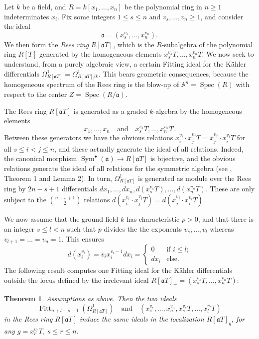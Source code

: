 \documentclass[oneside, 12pt]{amsart}
\newtheorem{theorem}{Theorem}[section]
\theoremstyle{definition}
\theoremstyle{remark}
\renewcommand{\AA}{\mathbb{A}}
\newcommand{\ideala}{\mathfrak{a}}
\newcommand{\Fitt}{\operatorname{Fitt}}
\newcommand{\quadand}{\quad\text{and}\quad}
\newcommand{\ra}{\rightarrow}
\newcommand{\Spec}{\operatorname{Spec}}
\newcommand{\Sym}{\operatorname{Sym}}
\begin{document}
Let $k$ be a field, and $R=k[x_1,\ldots,x_n]$ be the polynomial
ring in $n\geq 1$ indeterminates $x_i$. 
Fix some integers $1\leq s\leq n$ and  $v_s,\ldots,v_n \geq 1$,
and consider the ideal
$$
\ideala=(x_s^{v_s},\ldots,x_n^{v_n}).
$$
We then form the \emph{Rees ring} $R[\ideala T]$, 
which is the $R$-subalgebra of the polynomial ring $R[T]$
generated by the homogeneous elements $x_s^{v_s}T,\ldots,x_n^{v_n}T$.
We now seek to understand, from a purely algebraic view,   a certain Fitting ideal  
for the K\"ahler differentials 
$\Omega^1_{R[\ideala T]} = \Omega^1_{R[\ideala T]/k}$.  
This bears geometric consequences,
because the homogeneous spectrum of the Rees ring is the blow-up of $\AA^n=\Spec(R)$
with respect to the center $Z=\Spec(R/\ideala)$.

The Rees ring $R[\ideala T]$ is generated as a graded $k$-algebra 
by the homogeneous elements
$$
x_1 ,\ldots,x_n \quadand x_s^{v_s}T,\ldots,x_n^{v_n}T.
$$
Between these generators we  have the obvious relations
$x_i^{v_i}\cdot x_j^{v_j}T = x_j^{v_j}\cdot x_i^{v_i}T$ 
for all $s\leq i< j\leq n$, and these actually generate the ideal of all relations.
Indeed, the canonical morphism $\Sym^\bullet(\ideala)\ra R[\ideala T]$ is bijective,
and the obvious relations generate the ideal of all relations for the symmetric algebra
(see \cite{Micali 1964}, Theorem 1 and Lemma 2).
In turn,    $\Omega^1_{R[\ideala T]}$ is generated as module over the Rees ring by   $2n-s+1$ differentials 
$dx_1, \ldots, dx_n, d(x_s^{v_s}T),\ldots,d(x_n^{v_n}T)$.
These are only subject  to the $\binom{n-s+1}{2}$ relations $d(x_i^{v_i}\cdot x_j^{v_j}T) = d(x_j^{v_j}\cdot x_i^{v_i}T)$.

We now assume that the ground field $k$ has characteristic $p>0$, and  that there is an integer $s \leq l<n$
such that   $p$ divides the the  exponents $v_s,\ldots,v_l$
whereas  $v_{l+1}=\ldots=v_n=1$. This ensures
$$
d(x_i^{v_i})= v_ix_i^{v_i-1}dx_i= \begin{cases}
0 & \text{if $i\leq l$;}\\
dx_i	& \text{else.}
\end{cases}
$$
The  following result computes one Fitting ideal for the K\"ahler differentials outside the locus
defined by the irrelevant ideal $R[\ideala T]_+=(x_s^{v_s}T,\ldots,x_n^{v_n}T)$:

\begin{theorem}
\label{thm:fitting}
Assumptions as above. Then  the two ideals 
$$
\Fitt_{n +l-s+1}(\Omega^1_{R[\ideala T]}) \quadand (x_s^{v_s},\ldots,x_n^{v_n},x_s^{v_s}T,\ldots,x_l^{v_l}T)
$$
in the Rees ring $R[\ideala T]$ induce  the same ideals  in the localization $R[\ideala T]_g$,
for any $g=x_r^{v_r}T$,   $s\leq r\leq n$.
\end{theorem}
\end{document}
